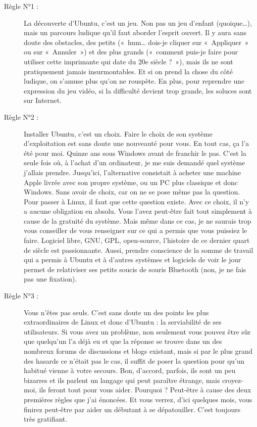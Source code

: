 \begin{description}
\item[Règle N°1 :] La découverte d'Ubuntu, c'est un jeu. Non pas un jeu d'enfant (quoique\ldots{}), mais un parcours ludique qu'il faut aborder l'esprit ouvert. Il y aura sans doute des obstacles, des petits («~hum\ldots{} dois-je cliquer sur «~Appliquer~» ou sur «~Annuler~») et des plus grands («~comment puis-je faire pour utiliser cette imprimante qui date du 20e siècle ?~»), mais ils ne sont pratiquement jamais insurmontables. Et si on prend la chose du côté ludique, on s'amuse plus qu'on ne rouspète. En plus, pour reprendre une expression du jeu vidéo, si la difficulté devient trop grande, les soluces sont sur Internet.
\item[Règle N°2 :] Installer Ubuntu, c'est un choix. Faire le choix de son système d'exploitation est sans doute une nouveauté pour vous. En tout cas, ça l'a été pour moi. Quinze ans sous Windows avant de franchir le pas. C'est la seule fois où, à l'achat d'un ordinateur, je me suis demandé quel système j'allais prendre. Jusqu'ici, l'alternative consistait à acheter une machine Apple livrée avec son propre système, ou un PC plus classique et donc Windows. Sans avoir de choix, car on ne se pose même pas la question. Pour passer à Linux, il faut que cette question existe. Avec ce choix, il n'y a aucune obligation en absolu. Vous l'avez peut-être fait tout simplement à cause de la gratuité du système. Mais même dans ce cas, je ne saurais trop vous conseiller de vous renseigner sur ce qui a permis que vous puissiez le faire. Logiciel libre, GNU, GPL, open-source, l'histoire de ce dernier quart de siècle est passionnante. Aussi, prendre conscience de la somme de travail qui a permis à Ubuntu et à d'autres systèmes et logiciels de voir le jour permet de relativiser ses petits soucis de souris Bluetooth (non, je ne fais pas une fixation).
\item[Règle N°3 :] Vous n'êtes pas seuls. C'est sans doute un des points les plus extraordinaires de Linux et donc d'Ubuntu : la serviabilité de ses utilisateurs. Si vous avez un problème, non seulement vous pouvez être sûr que quelqu'un l'a déjà eu et que la réponse se trouve dans un des nombreux forums de discussions et blogs existant, mais si par le plus grand des hasards ce n'était pas le cas, il suffit de poser la question pour qu'un habitué vienne à votre secours. Bon, d'accord, parfois, ils sont un peu bizarres et ils parlent un langage qui peut paraître étrange, mais croyez-moi, ils feront tout pour vous aider. Pourquoi ? Peut-être à cause des deux premières règles que j'ai énoncées. Et vous verrez, d'ici quelques mois, vous finirez peut-être par aider un débutant à se dépatouiller. C'est toujours très gratifiant.

\end{description}
